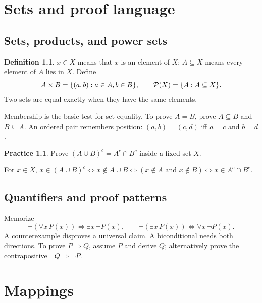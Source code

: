 \documentclass[11pt,openany]{book}
\theoremstyle{definition}
\newtheorem{definition}[theorem]{Definition}
\newtheorem{exercise}[theorem]{Practice}
\begin{document}
\mainmatter

\chapter{Sets and proof language}
\section{Sets, products, and power sets}
\begin{definition}
$x\in X$ means that $x$ is an element of $X$; $A\subseteq X$ means every element of $A$ lies in $X$. Define
\[
A\times B=\{(a,b):a\in A,b\in B\},\qquad \mathcal P(X)=\{A:A\subseteq X\}.
\]
Two sets are equal exactly when they have the same elements.
\end{definition}
\begin{intuition}
Membership is the basic test for set equality. To prove $A=B$, prove $A\subseteq B$ and $B\subseteq A$. An ordered pair remembers position: $(a,b)=(c,d)$ iff $a=c$ and $b=d$.
\end{intuition}
\begin{exercise}Prove $(A\cup B)^c=A^c\cap B^c$ inside a fixed set $X$.\end{exercise}
\begin{solution}For $x\in X$,
$x\in(A\cup B)^c\iff x\notin A\cup B\iff(x\notin A\text{ and }x\notin B)\iff x\in A^c\cap B^c$.\end{solution}

\section{Quantifiers and proof patterns}
Memorize
\[
\neg(\forall x\,P(x))\iff\exists x\,\neg P(x),\qquad
\neg(\exists x\,P(x))\iff\forall x\,\neg P(x).
\]
A counterexample disproves a universal claim. A biconditional needs both directions. To prove $P\Rightarrow Q$, assume $P$ and derive $Q$; alternatively prove the contrapositive $\neg Q\Rightarrow\neg P$.


\chapter{Mappings}
\end{document}
